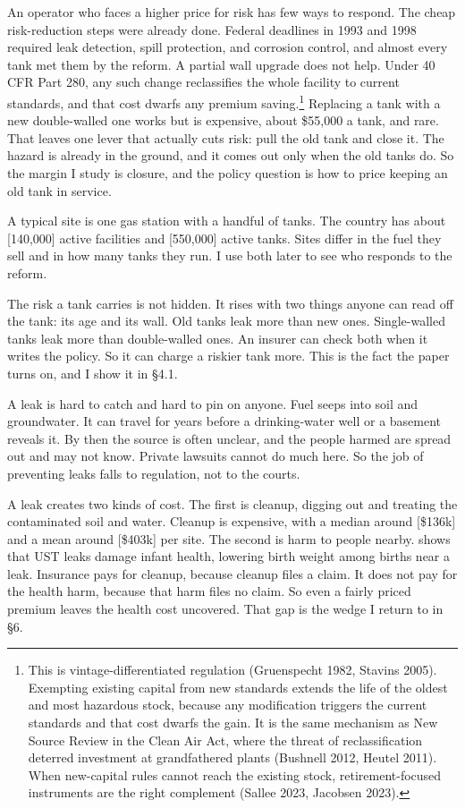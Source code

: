 \documentclass[
  12pt,
]{article}
\begin{document}
An operator who faces a higher price for risk has few ways to respond.
The cheap risk-reduction steps were already done. Federal deadlines in
1993 and 1998 required leak detection, spill protection, and corrosion
control, and almost every tank met them by the reform. A partial wall
upgrade does not help. Under 40 CFR Part 280, any such change
reclassifies the whole facility to current standards, and that cost
dwarfs any premium saving.\footnote{This is vintage-differentiated
  regulation (Gruenspecht 1982, Stavins 2005). Exempting existing
  capital from new standards extends the life of the oldest and most
  hazardous stock, because any modification triggers the current
  standards and that cost dwarfs the gain. It is the same mechanism as
  New Source Review in the Clean Air Act, where the threat of
  reclassification deterred investment at grandfathered plants (Bushnell
  2012, Heutel 2011). When new-capital rules cannot reach the existing
  stock, retirement-focused instruments are the right complement (Sallee
  2023, Jacobsen 2023).} Replacing a tank with a new double-walled one
works but is expensive, about \$55,000 a tank, and rare. That leaves one
lever that actually cuts risk: pull the old tank and close it. The
hazard is already in the ground, and it comes out only when the old
tanks do. So the margin I study is closure, and the policy question is
how to price keeping an old tank in service.

A typical site is one gas station with a handful of tanks. The country
has about {[}140,000{]} active facilities and {[}550,000{]} active
tanks. Sites differ in the fuel they sell and in how many tanks they
run. I use both later to see who responds to the reform.

The risk a tank carries is not hidden. It rises with two things anyone
can read off the tank: its age and its wall. Old tanks leak more than
new ones. Single-walled tanks leak more than double-walled ones. An
insurer can check both when it writes the policy. So it can charge a
riskier tank more. This is the fact the paper turns on, and I show it in
§4.1.

A leak is hard to catch and hard to pin on anyone. Fuel seeps into soil
and groundwater. It can travel for years before a drinking-water well or
a basement reveals it. By then the source is often unclear, and the
people harmed are spread out and may not know. Private lawsuits cannot
do much here. So the job of preventing leaks falls to regulation, not to
the courts.

A leak creates two kinds of cost. The first is cleanup, digging out and
treating the contaminated soil and water. Cleanup is expensive, with a
median around {[}\$136k{]} and a mean around {[}\$403k{]} per site. The
second is harm to people nearby. \citet{marcus_going_2021} shows that
UST leaks damage infant health, lowering birth weight among births near
a leak. Insurance pays for cleanup, because cleanup files a claim. It
does not pay for the health harm, because that harm files no claim. So
even a fairly priced premium leaves the health cost uncovered. That gap
is the wedge I return to in §6.
\end{document}
